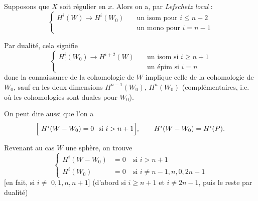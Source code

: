 \documentclass[11pt,a4paper]{article}
\begin{document}


Supposons que $X$ soit régulier en $x$. Alors on a, par
\emph{Lefschetz local} :
\[
  \left\{\begin{aligned}
    H^{i}(W) \longrightarrow H^{i}(W_0) \quad &\text{un isom pour } i \leq n-2 \\
    &\text{un mono pour } i = n-1
  \end{aligned}\right.
\]


Par  dualité, cela signifie
\[
  \left\{\begin{aligned}
    H^{i}_{!}(W_0) \longrightarrow H^{i+2}(W) \quad &\text{un isom si } i \geq n+1 \\
    &\text{un épim si } i = n
  \end{aligned}\right.
\]
donc la connaissance de la cohomologie de $W$ implique celle de la
cohomologie de $W_0$, sauf en les deux dimensions 
$H^{n-1}(W_0)$, $H^{n}(W_0)$ (complémentaires, i.e. où les cohomologies sont
duales pour $W_0$).

On peut dire aussi que l'on a
\[
  \Bigl[\ H^{i}(W - W_0) = 0 \ \text{ si } i > n+1 \Bigr],
  \qquad H^{i}(W - W_0) = H^{i}(P).
\]


Revenant au cas $W$ une sphère, on trouve
\[
  \left\{\begin{aligned}
    H^{i}(W - W_0) &= 0 \quad \text{si } i > n+1 \\
    H^{i}(W_0) &= 0 \quad \text{si } i \neq n-1, n, 0, 2n-1
  \end{aligned}\right.
\]
[en fait, si $i \neq$ \struck{\ill{}} $0, 1, n, n+1$] (d'abord si $i \geq n+1$
et $i \neq 2n-1$, puis le reste par dualité)
\end{document}
